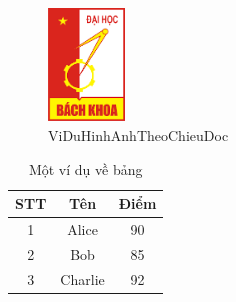 \documentclass{article} %
\begin{document}
% 
% 
% 
% 
% 
% 
% 
% 
% 
% 





 






 
\begin{figure}[h]  
\centering
\includegraphics[height=3cm]{pictures/logoBK.png}
\caption{ViDuHinhAnhTheoChieuDoc} %
\label{pictures:nghia2} %
\end{figure} 





\begin{table}[ht]
\centering
\caption{Một ví dụ về bảng}
\begin{tabular}{|c|c|c|}
\hline
\textbf{STT} & \textbf{Tên} & \textbf{Điểm} \\
\hline
1 & Alice & 90 \\
2 & Bob & 85 \\
3 & Charlie & 92 \\
\hline
\end{tabular}
\label{table:example}
\end{table}
\end{document}
